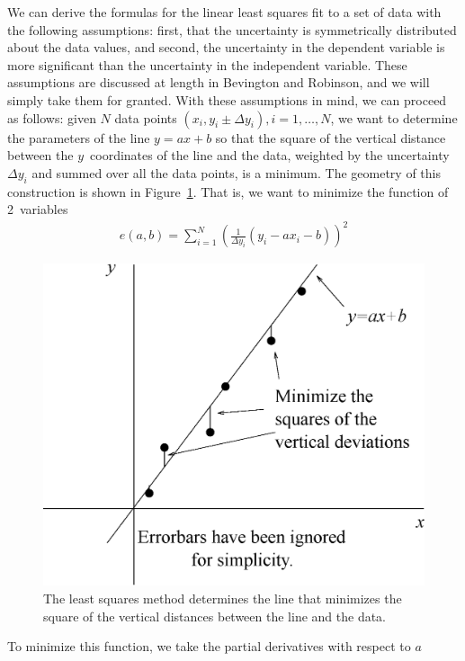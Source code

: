 We can derive the formulas for the linear least squares fit to a set of data 
with the following assumptions: first, that the uncertainty is symmetrically 
distributed about the data values, and second, the uncertainty in the 
dependent variable is more significant than the uncertainty in the independent 
variable. These assumptions are discussed at length in Bevington and Robinson, 
and we will simply take them for granted. With these assumptions in mind, we 
can proceed as follows: given $N$ data points 
$(x_i,y_i \pm \Delta y_i), i=1,\ldots,N$, we want to determine the parameters 
of the line $y=ax+b$ so that the square of the vertical distance between the 
$y$~coordinates of the line and the data, weighted by the uncertainty 
$\Delta y_i$ and summed over all the data points, is a minimum. The geometry 
of this construction is shown in Figure~\ref{fig:intro:least squares}. That is,
we want to minimize the function of 2~variables
\begin{eqnarray*}
e(a,b) = \sum^{N}_{i=1} \left( \frac{1}{\Delta y_i} (y_i-ax_i-b)\right)^2
\end{eqnarray*}
\begin{figure}[!htb]
\centering
\epsfxsize=12cm \includegraphics[scale=0.6]{0_intro/graph.eps}
\caption{The least squares method determines the line that minimizes the 
square of the vertical distances between the line and the data.}
\label{fig:intro:least squares}
\end{figure}
To minimize this function, we take the partial derivatives with respect to $a$ 
